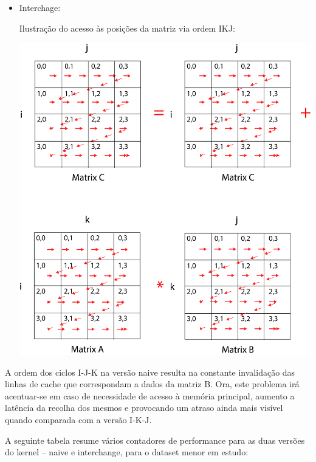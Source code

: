 \documentclass[conference,compsoc]{IEEEtran}
\begin{document}
\begin{itemize}
\item {Interchage: \par   %
  Ilustração do acesso às posições da matriz via ordem IKJ:\par 
    \includegraphics[width=0.75\columnwidth]{PNG/matrix_ikj_final.png}
}
\end{itemize}


A ordem dos ciclos I-J-K na versão naive resulta na constante invalidação das linhas de cache que correspondam a dados da matriz B. Ora, este problema irá acentuar-se em caso de necessidade de acesso à memória principal, aumento a latência da recolha dos mesmos e provocando um atraso ainda mais visível quando comparada com a versão I-K-J.\par 


A seguinte tabela resume vários contadores de performance para as duas versões do kernel -- naive e interchange, para o dataset menor em estudo:
\end{document}
